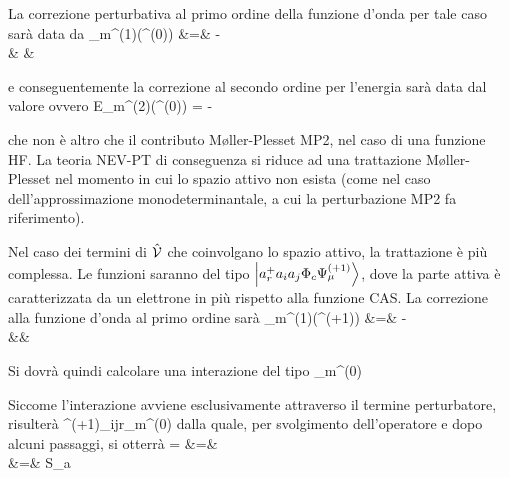La correzione perturbativa al primo ordine della funzione d'onda
per tale caso sar\`a data da
\beqa
\Psi_{m}^{(1)}(\perturb^{(0)}) &=& -   
 \nonumber \\
& & \times {}
\eeqa

e conseguentemente la correzione al secondo ordine per l'energia sar\`a data
dal valore
\beq
{}
\eeq
ovvero
\beq
E_{m}^{(2)}(\perturb^{(0)}) = -   
\eeq

che non \`e altro che il contributo M{\o}ller-Plesset MP2, nel caso di una funzione HF.
La teoria NEV-PT di conseguenza si riduce ad una trattazione M{\o}ller-Plesset
nel momento in cui lo spazio attivo non esista (come nel caso
dell'approssimazione monodeterminantale,
a cui la perturbazione MP2 fa riferimento).

Nel caso dei termini di $\hat{\mathcal{V}}$ che coinvolgano lo spazio attivo, la
trattazione \`e pi\`u complessa. Le funzioni saranno del tipo $\left| a_{r}^{+}
a_{i}a_{j}\Phi_c \Psi_{\mu}^{(+1)} \right\rangle$, dove la parte attiva \`e
caratterizzata da un elettrone in pi\`u rispetto alla funzione CAS.
La correzione alla funzione d'onda al primo ordine sar\`a
\beqa
\Psi_{m}^{(1)}(\perturb^{(+1)}) &=& -   \sumidx{\mu}
 \nonumber \\ 
&\times& 
\eeqa

Si dovr\`a quindi calcolare una interazione del tipo
\beq
{}
{\ham}{\Psi_m^{(0)}}
\eeq

Siccome l'interazione avviene esclusivamente attraverso
il termine perturbatore, risulter\`a
\beq
{} {\perturb^{(+1)}_{ijr}}{\Psi_m^{(0)}}
\eeq
dalla quale, per svolgimento dell'operatore e dopo alcuni passaggi, si
otterr\`a
\beqas
{} = 
\eeqas
\beqa
&=&    \nonumber \\
&=&   S_{\mu a} 
\eeqa

